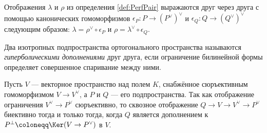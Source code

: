\documentclass[
	extrafontsizes,
	11pt,
	hyphens,
]{memoir}
\begin{document}

\begin{observation}
Отображения \(\lambda\) и \(\rho\) из определения \ref{def:PerfPair} выражаются друг через друга
с помощью канонических гомоморфизмов
\(\epsilon_P : P \to (P^\vee)^\vee\) и \(\epsilon_Q : Q \to (Q^\vee)^\vee\) следующим образом:
\(
\lambda = \rho^\vee \circ \epsilon_P
\)
и
\(
\rho = \lambda^\vee \circ \epsilon_Q
\).
\end{observation}

\begin{definition}
Два изотропных подпространства
ортогонального пространства
называются \emph{гиперболическими дополнениями} друг друга, если
ограничение билинейной формы определяет совершенное спаривание между ними.
\end{definition}



\begin{observation}
Пусть \(V\) --- векторное пространство над полем \(K\), снабжённое сюръективным гомоморфизмом \(V \to V^\vee\), а \(P\) и \(Q\) --- его подпространства.
Так как отображение ограничения \(V^\vee \to P^\vee\) сюръективно, то
сквозное отображение \(Q \to V \to V^\vee \to P^\vee\) биективно тогда и только тогда, когда
\(Q\) является дополнением к
\(P^\perp \coloneqq \Ker(V \to P^\vee)\)
в \(V\).
\end{observation}
\end{document}
